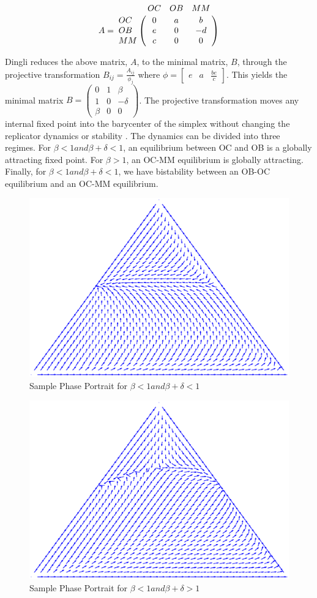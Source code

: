 \documentclass[12pt]{amsart}
\begin{document}
$$A = \bordermatrix{\text{}&OC&OB&MM\cr
                OC& 0 & a& b \cr
                OB& e  &  0 & -d \cr
                MM& c & 0 & 0 \cr
               }$$

Dingli reduces the above matrix, $A$, to the minimal matrix, $B$, through the projective transformation $B_{ij} = \frac{A_{ij}}{\phi_j}$ where 
$\phi = {\begin{bmatrix} e & a & \frac{be}{c} \end{bmatrix}}$.
This yields the minimal matrix
$B = {\begin{pmatrix}
0 & 1 & \beta \\
1 & 0 & -\delta \\
\beta & 0 & 0
\end{pmatrix}}$. 
The projective transformation moves any internal fixed point into the barycenter of the simplex without changing the replicator dynamics or stability \cite{Hofbauer1998}. The dynamics can be divided into three regimes. For $\beta < 1 and \beta + \delta < 1$, an equilibrium between OC and OB is a globally attracting fixed point. For $\beta > 1$, an OC-MM equilibrium is globally attracting. Finally, for $\beta < 1 and \beta + \delta < 1$, we have bistability between an OB-OC equilibrium and an OC-MM equilibrium. 
\begin{figure}[htb]
\caption{Sample Phase Portrait for  $\beta < 1 and \beta + \delta < 1$  }
\centering
\includegraphics[width = 1.5 in]{Diagrams/Dingli/OCOB}
\end{figure}

\begin{figure}[htb]
\caption{Sample Phase Portrait for  $\beta < 1 and \beta + \delta > 1$  }
\centering
\includegraphics[width = 1.5 in]{Diagrams/Dingli/bistable}
\end{figure}
\end{document}
